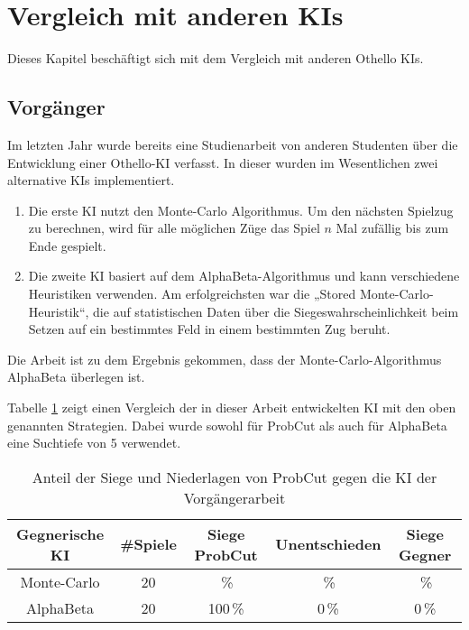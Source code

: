 
\section{Vergleich mit anderen KIs}
Dieses Kapitel beschäftigt sich mit dem Vergleich mit anderen Othello KIs.

\subsection{Vorgänger}
Im letzten Jahr wurde bereits eine Studienarbeit von anderen Studenten über die Entwicklung einer Othello-KI verfasst.
In dieser wurden im Wesentlichen zwei alternative KIs implementiert.
\begin{enumerate}
    \item Die erste KI nutzt den Monte-Carlo Algorithmus. Um den nächsten Spielzug zu berechnen, wird für alle möglichen
    Züge das Spiel $n$ Mal zufällig bis zum Ende gespielt.
    \cite[S.~19]{othellustudienarbeit}
    \item Die zweite KI basiert auf dem AlphaBeta-Algorithmus und kann verschiedene Heuristiken verwenden. Am
    erfolgreichsten war die „Stored Monte-Carlo-Heuristik“, die auf statistischen Daten über die
    Siegeswahrscheinlichkeit beim Setzen auf ein bestimmtes Feld in einem bestimmten Zug beruht.
    \cite[S.~30]{othellustudienarbeit}
\end{enumerate}
Die Arbeit ist zu dem Ergebnis gekommen, dass der Monte-Carlo-Algorithmus AlphaBeta überlegen ist.
\cite[S.~55]{othellustudienarbeit}

Tabelle \ref{table:comp:previous} zeigt einen Vergleich der in dieser Arbeit entwickelten KI mit den oben genannten Strategien. Dabei wurde sowohl für ProbCut als auch für AlphaBeta eine Suchtiefe von 5 verwendet.

\begin{table}[hb]
\centering
\begin{tabular}{c|c|ccc}
\hline
Gegnerische KI & \#Spiele & Siege ProbCut & Unentschieden & Siege Gegner \\
\hline
 Monte-Carlo & 20 & \,\% &  \,\% & \,\% \\ %
 AlphaBeta   & 20 & 100\,\% &   0\,\% &  0\,\% \\
\hline
\end{tabular}
\caption{Anteil der Siege und Niederlagen von ProbCut gegen die KI der Vorgängerarbeit}
\label{table:comp:previous}
\end{table}
